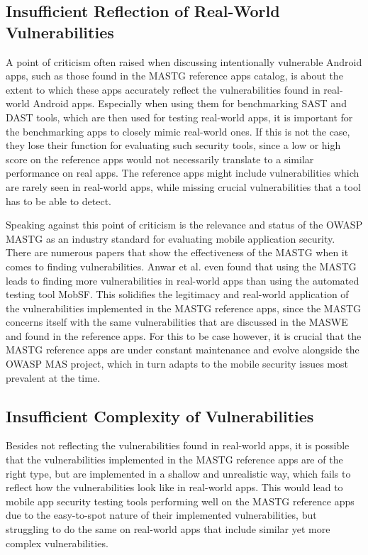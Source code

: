 \subsection{Insufficient Reflection of Real-World Vulnerabilities}
A point of criticism often raised when discussing intentionally vulnerable Android apps, such as those found in the MASTG reference apps catalog, is about the extent to which these apps accurately reflect the vulnerabilities found in real-world Android apps. Especially when using them for benchmarking SAST and DAST tools, which are then used for testing real-world apps, it is important for the benchmarking apps to closely mimic real-world ones. If this is not the case, they lose their function for evaluating such security tools, since a low or high score on the reference apps would not necessarily translate to a similar performance on real apps. The reference apps might include vulnerabilities which are rarely seen in real-world apps, while missing crucial vulnerabilities that a tool has to be able to detect. 

Speaking against this point of criticism is the relevance and status of the OWASP MASTG as an industry standard for evaluating mobile application security. There are numerous papers \cite{paper_01, paper_02, paper_04, paper_05, paper_07, paper_14} that show the effectiveness of the MASTG when it comes to finding vulnerabilities. Anwar et al. \cite{paper_03} even found that using the MASTG leads to finding more vulnerabilities in real-world apps than using the automated testing tool MobSF. This solidifies the legitimacy and real-world application of the vulnerabilities implemented in the MASTG reference apps, since the MASTG concerns itself with the same vulnerabilities that are discussed in the MASWE and found in the reference apps. For this to be case however, it is crucial that the MASTG reference apps are under constant maintenance and evolve alongside the OWASP MAS project, which in turn adapts to the mobile security issues most prevalent at the time.

\subsection{Insufficient Complexity of Vulnerabilities}
Besides not reflecting the vulnerabilities found in real-world apps, it is possible that the vulnerabilities implemented in the MASTG reference apps are of the right type, but are implemented in a shallow and unrealistic way, which fails to reflect how the vulnerabilities look like in real-world apps. This would lead to mobile app security testing tools performing well on the MASTG reference apps due to the easy-to-spot nature of their implemented vulnerabilities, but struggling to do the same on real-world apps that include similar yet more complex vulnerabilities. 


